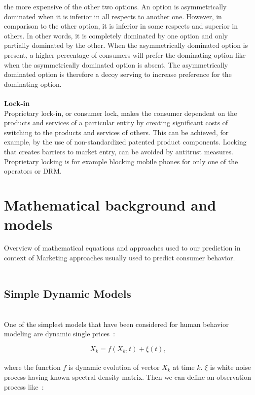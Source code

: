 the more expensive of the other two options. An option is asymmetrically dominated when it is inferior in all respects to another one.
However, in comparison to the other option, it is inferior in some respects and superior in others. In other words, it is completely
dominated by one option and only partially dominated by the other. When the asymmetrically dominated option is present, a higher
percentage of consumers will prefer the dominating option like when the asymmetrically dominated option is absent.
The asymmetrically dominated option is therefore a decoy serving to increase preference for the dominating option.\\
\\
\textbf{Lock-in} \label{subsec:lock-in}\\
Proprietary lock-in, or consumer lock, makes the consumer dependent on the products and services of a particular entity
by creating significant costs of switching to the products and services of others. This can be achieved, for example,
by the use of non-standardized patented product components. Locking that creates barriers to market entry, can be avoided by antitrust measures.
Proprietary locking is for example blocking mobile phones for only one of the operators or DRM.
\\
\section{Mathematical background and models} \label{sec:introduction}
Overview of mathematical equations and approaches used to our prediction in context of Marketing approaches usually used to predict consumer behavior.\\
\\
\subsection{Simple Dynamic Models} \label{subsec:simpleDynamicModels}\\
One of the simplest models that have been considered for human behavior modeling are dynamic single prices~\cite{pantland}:

\begin{equation} \label{eq:1}
X_k = f(X_k, t) + \xi(t),
\end{equation}
\\
where the function $f$ is dynamic evolution of vector $X_k$ at time $k$. $\xi$ is white noise process having known spectral density matrix.
Then we can define an observation process like~\cite{pantland}:

